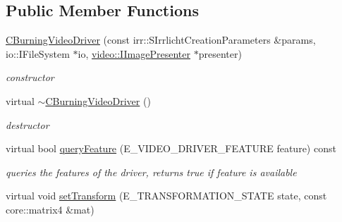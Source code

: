 \subsection*{Public Member Functions}
\begin{DoxyCompactItemize}
\item 
\hypertarget{classirr_1_1video_1_1_c_burning_video_driver_a946e0f416d33fb7b386274c2e65b5b48}{\hyperlink{classirr_1_1video_1_1_c_burning_video_driver_a946e0f416d33fb7b386274c2e65b5b48}{C\-Burning\-Video\-Driver} (const irr\-::\-S\-Irrlicht\-Creation\-Parameters \&params, io\-::\-I\-File\-System $\ast$io, \hyperlink{classirr_1_1video_1_1_i_image_presenter}{video\-::\-I\-Image\-Presenter} $\ast$presenter)}\label{classirr_1_1video_1_1_c_burning_video_driver_a946e0f416d33fb7b386274c2e65b5b48}

\begin{DoxyCompactList}\small\item\em constructor \end{DoxyCompactList}\item 
\hypertarget{classirr_1_1video_1_1_c_burning_video_driver_a07439a0f3414498dc2bce36371d536a1}{virtual \hyperlink{classirr_1_1video_1_1_c_burning_video_driver_a07439a0f3414498dc2bce36371d536a1}{$\sim$\-C\-Burning\-Video\-Driver} ()}\label{classirr_1_1video_1_1_c_burning_video_driver_a07439a0f3414498dc2bce36371d536a1}

\begin{DoxyCompactList}\small\item\em destructor \end{DoxyCompactList}\item 
\hypertarget{classirr_1_1video_1_1_c_burning_video_driver_a58b1553531f0714d79e01aeac7aa236c}{virtual bool \hyperlink{classirr_1_1video_1_1_c_burning_video_driver_a58b1553531f0714d79e01aeac7aa236c}{query\-Feature} (E\-\_\-\-V\-I\-D\-E\-O\-\_\-\-D\-R\-I\-V\-E\-R\-\_\-\-F\-E\-A\-T\-U\-R\-E feature) const }\label{classirr_1_1video_1_1_c_burning_video_driver_a58b1553531f0714d79e01aeac7aa236c}

\begin{DoxyCompactList}\small\item\em queries the features of the driver, returns true if feature is available \end{DoxyCompactList}\item 
\hypertarget{classirr_1_1video_1_1_c_burning_video_driver_ad07983f5e30c88a70d8b349a70bdc2ea}{virtual void \hyperlink{classirr_1_1video_1_1_c_burning_video_driver_ad07983f5e30c88a70d8b349a70bdc2ea}{set\-Transform} (E\-\_\-\-T\-R\-A\-N\-S\-F\-O\-R\-M\-A\-T\-I\-O\-N\-\_\-\-S\-T\-A\-T\-E state, const core\-::matrix4 \&mat)}\label{classirr_1_1video_1_1_c_burning_video_driver_ad07983f5e30c88a70d8b349a70bdc2ea}


\end{DoxyCompactItemize}
